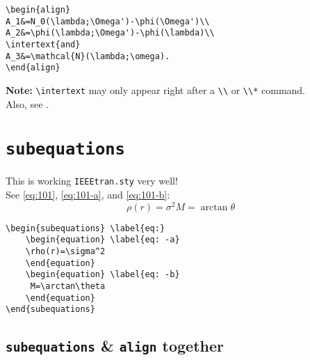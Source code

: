\documentclass[journal]{IEEEtran}
\begin{document}
\begin{verbatim}
\begin{align}
A_1&=N_0(\lambda;\Omega')-\phi(\Omega')\\
A_2&=\phi(\lambda;\Omega')-\phi(\lambda)\\
\intertext{and}
A_3&=\mathcal{N}(\lambda;\omega).
\end{align}
\end{verbatim}

\textbf{Note:} \verb!\intertext! may only appear right after a \verb!\\! or \verb!\\*! command.\\[6pt]

\noindent Also, see .

\noindent \dotfill
\section{\texttt{subequations}}
This is working \verb!IEEEtran.sty! very well!\\
See \eqref{eq:101}, \eqref{eq:101-a}, and \eqref{eq:101-b}:
\begin{subequations} \label{eq:101}
	\begin{equation} \label{eq:101-a}
	\rho(r)=\sigma^2
	\end{equation}
	\begin{equation} \label{eq:101-b}
   	 M = \arctan\theta
	\end{equation}
\end{subequations}

\begin{verbatim}
\begin{subequations} \label{eq:}
	\begin{equation} \label{eq: -a}
	\rho(r)=\sigma^2 
	\end{equation}
	\begin{equation} \label{eq: -b}
	 M=\arctan\theta 
	\end{equation}
\end{subequations}
\end{verbatim}


\subsection{\texttt{subequations} \& \texttt{align} together}
\end{document}
